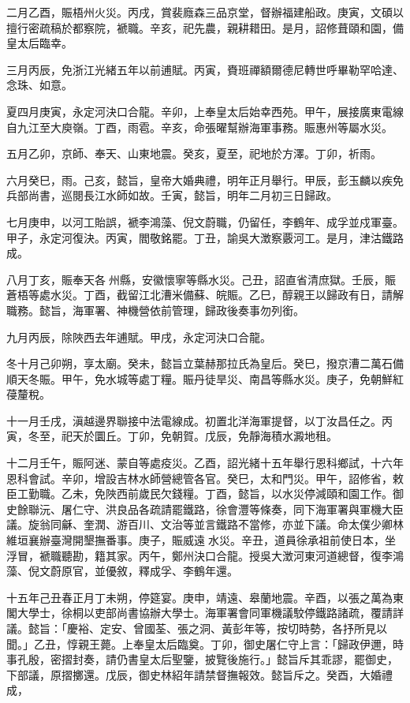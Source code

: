 \begin{pinyinscope}
二月乙酉，賑梧州火災。丙戌，賞裴廕森三品京堂，督辦福建船政。庚寅，文碩以擅行密疏稿於都察院，褫職。辛亥，祀先農，親耕耤田。是月，詔修葺頤和園，備皇太后臨幸。

三月丙辰，免浙江光緒五年以前逋賦。丙寅，賚班禪額爾德尼轉世呼畢勒罕哈達、念珠、如意。

夏四月庚寅，永定河決口合龍。辛卯，上奉皇太后始幸西苑。甲午，展接廣東電線自九江至大庾嶺。丁酉，雨雹。辛亥，命張曜幫辦海軍事務。賑惠州等屬水災。

五月乙卯，京師、奉天、山東地震。癸亥，夏至，祀地於方澤。丁卯，祈雨。

六月癸巳，雨。己亥，懿旨，皇帝大婚典禮，明年正月舉行。甲辰，彭玉麟以疾免兵部尚書，巡閱長江水師如故。壬寅，懿旨，明年二月初三日歸政。

七月庚申，以河工貽誤，褫李鴻藻、倪文蔚職，仍留任，李鶴年、成孚並戍軍臺。甲子，永定河復決。丙寅，閻敬銘罷。丁丑，諭吳大澂察覈河工。是月，津沽鐵路成。

八月丁亥，賑奉天各州縣，安徽懷寧等縣水災。己丑，詔直省清庶獄。壬辰，賑蒼梧等處水災。丁酉，截留江北漕米備蘇、皖賑。乙巳，醇親王以歸政有日，請解職務。懿旨，海軍署、神機營依前管理，歸政後奏事勿列銜。

九月丙辰，除陜西去年逋賦。甲戌，永定河決口合龍。

冬十月己卯朔，享太廟。癸未，懿旨立葉赫那拉氏為皇后。癸巳，撥京漕二萬石備順天冬賑。甲午，免水城等處丁糧。賑丹徒旱災、南昌等縣水災。庚子，免朝鮮紅葠釐稅。

十一月壬戌，滇越邊界聯接中法電線成。初置北洋海軍提督，以丁汝昌任之。丙寅，冬至，祀天於圜丘。丁卯，免朝賀。戊辰，免靜海積水澱地租。

十二月壬午，賑阿迷、蒙自等處疫災。乙酉，詔光緒十五年舉行恩科鄉試，十六年恩科會試。辛卯，增設吉林水師營總管各官。癸巳，太和門災。甲午，詔修省，敕臣工勤職。乙未，免陜西前歲民欠錢糧。丁酉，懿旨，以水災停減頤和園工作。御史餘聯沅、屠仁守、洪良品各疏請罷鐵路，徐會灃等條奏，同下海軍署與軍機大臣議。旋翁同龢、奎潤、游百川、文治等並言鐵路不當修，亦並下議。命太僕少卿林維垣襄辦臺灣開墾撫番事。庚子，賑威遠水災。辛丑，道員徐承祖前使日本，坐浮冒，褫職聽勘，籍其家。丙午，鄭州決口合龍。授吳大澂河東河道總督，復李鴻藻、倪文蔚原官，並優敘，釋成孚、李鶴年還。

十五年己丑春正月丁未朔，停筵宴。庚申，靖遠、皋蘭地震。辛酉，以張之萬為東閣大學士，徐桐以吏部尚書協辦大學士。海軍署會同軍機議駮停鐵路諸疏，覆請詳議。懿旨：「慶裕、定安、曾國荃、張之洞、黃彭年等，按切時勢，各抒所見以聞。」乙丑，惇親王薨。上奉皇太后臨奠。丁卯，御史屠仁守上言：「歸政伊邇，時事孔殷，密摺封奏，請仍書皇太后聖鑒，披覽後施行。」懿旨斥其乖謬，罷御史，下部議，原摺擲還。戊辰，御史林紹年請禁督撫報效。懿旨斥之。癸酉，大婚禮成，


\end{pinyinscope}
